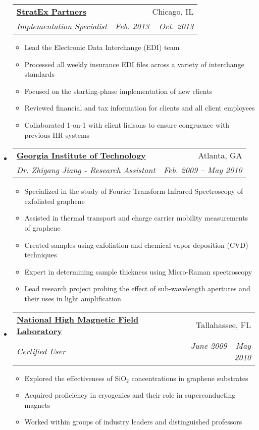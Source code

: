 \documentclass[letterpaper,11pt]{article}
\makeatletter
\newcommand{\resitem}[1]{\item #1 \vspace{-2pt}}
\newcommand{\ressubheading}[4]{
\begin{tabular*}{6.5in}{l@{\extracolsep{\fill}}r}
		\textbf{#1} & #2 \\
		\textit{#3} & \textit{#4} \\
\end{tabular*}\vspace{-6pt}}
\makeatother
\begin{document}
\begin{itemize}
  \ressubheading{\href{http://www.stratexpartners.com/}{StratEx Partners}}{Chicago, IL}{Implementation Specialist}{Feb. 2013 -- Oct. 2013}
    { \footnotesize
    \begin{itemize}
        \resitem{Lead the Electronic Data Interchange (EDI) team}
        \resitem{Processed all weekly insurance EDI files across a variety of interchange standards}
        \resitem{Focused on the starting-phase implementation of new clients}
        \resitem{Reviewed financial and tax information for clients and all client employees}
        \resitem{Collaborated 1-on-1 with client liaisons to ensure congruence with previous HR systems}
    \end{itemize}
    }

  \item
    \ressubheading{\href{http://phweb.physics.gatech.edu/research/jiang/members.html}{Georgia Institute of Technology}}{Atlanta, GA}{Dr. Zhigang Jiang - Research Assistant}{Feb. 2009 -- May 2010}
    { \footnotesize
    \begin{itemize}
        \resitem{Specialized in the study of Fourier Transform Infrared Spectroscopy of exfoliated graphene}
        \resitem{Assisted in thermal transport and charge carrier mobility measurements of graphene}
        \resitem{Created samples using exfoliation and chemical vapor deposition (CVD) techniques}
        \resitem{Expert in determining sample thickness using Micro-Raman spectroscopy}
        \resitem{Lead research project probing the effect of sub-wavelength apertures and their uses in light amplification}
    \end{itemize}
    }
  \item
    \ressubheading{\href{http://www.magnet.fsu.edu/}{National High Magnetic Field Laboratory}}{Tallahassee, FL}{Certified User}{June 2009 - May 2010}
    { \footnotesize
    \begin{itemize}
        \resitem{Explored the effectiveness of SiO$_{2}$ concentrations in graphene substrates}
        \resitem{Acquired proficiency in cryogenics and their role in superconducting magnets}
        \resitem{Worked within groups of industry leaders and distinguished professors}
    \end{itemize}
    }
\end{itemize}
\end{document}
